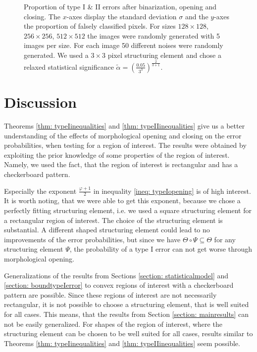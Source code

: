 \documentclass[a4paper,12pt]{article}
\theoremstyle{plain}
\theoremstyle{definition}
\begin{document}
\begin{figure}[H]
\begin{subfigure}[t]{0.48\linewidth}
	\end{subfigure}
	\caption{Proportion of type I \& II errors after binarization, opening and closing. The $x$-axes display the standard deviation $\sigma$ and the $y$-axes the proportion of falsely classified pixels. For sizes $128 \times 128$, $256 \times 256$, $512 \times 512$ the images were randomly generated with 5 images per size. For each image 50 different noises were randomly generated. We used a $3 \times 3$ pixel structuring element and chose a relaxed statistical significance $\tilde{\alpha} = \left( \frac{0.05}{3^3} \right)^{\frac{2}{3 + 1}}$.}
	\label{fig: simulationresults_relaxed}
\end{figure}

\newpage



\section{Discussion}\label{section: conclusion}

Theorems \ref{thm: typeIinequalities} and \ref{thm: typeIIinequalities} give us a better understanding of the effects of morphological opening and closing on the error probabilities, when testing for a region of interest. The results were obtained by exploiting the prior knowledge of some properties of the region of interest. Namely, we used the fact, that the region of interest is rectangular and has a checkerboard pattern.

Especially the exponent $\frac{\varphi + 1}{2}$ in inequality \eqref{ineq: typeIopening} is of high interest. It is worth noting, that we were able to get this exponent, because we chose a perfectly fitting structuring element, i.e. we used a square structuring element for a rectangular region of interest. The choice of the structuring element is substantial. A different shaped structuring element could lead to no improvements of the error probabilities, but since we have $\Theta \circ \Psi \subseteq \Theta$ for any structuring element $\Psi$, the probability of a type I error can not get worse through morphological opening.

Generalizations of the results from Sections \ref{section: statisticalmodel} and \ref{section: boundtypeIerror} to convex regions of interest with a checkerboard pattern are possible. Since these regions of interest are not necessarily rectangular, it is not possible to choose a structuring element, that is well suited for all cases. This means, that the results from Section \ref{section: mainresults} can not be easily generalized. For shapes of the region of interest, where the structuring element can be chosen to be well suited for all cases, results similar to Theorems \ref{thm: typeIinequalities} and \ref{thm: typeIIinequalities} seem possible.
\end{document}
